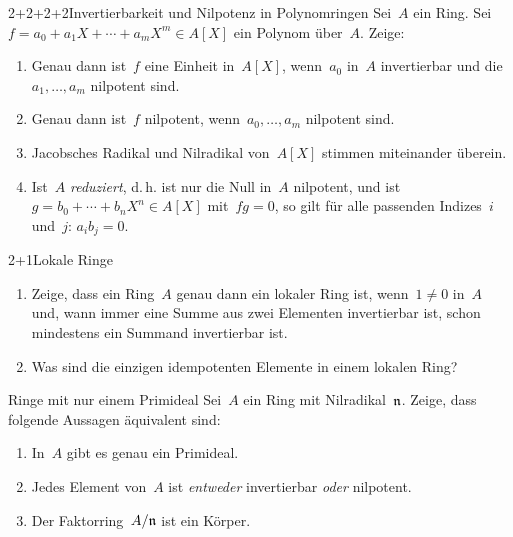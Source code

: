 \documentclass{uebblatt}
\begin{document}

\begin{aufgabe}{2+2+2+2}{Invertierbarkeit und Nilpotenz in Polynomringen}
Sei~$A$ ein Ring. Sei~$f = a_0 + a_1 X + \cdots + a_m X^m \in A[X]$ ein Polynom
über~$A$. Zeige:
\begin{enumerate}
\item Genau dann ist~$f$ eine Einheit in~$A[X]$, wenn~$a_0$ in~$A$ invertierbar
und die~$a_1,\ldots,a_m$ nilpotent sind.
\item Genau dann ist~$f$ nilpotent, wenn~$a_0,\ldots,a_m$ nilpotent sind.
\item Jacobsches Radikal und Nilradikal von~$A[X]$ stimmen miteinander überein.
\item Ist~$A$ \emph{reduziert}, d.\,h. ist nur die Null in~$A$ nilpotent,
und ist~$g = b_0 + \cdots + b_n X^n \in A[X]$ mit~$fg = 0$, so gilt für alle passenden Indizes~$i$ und~$j$: $a_i b_j = 0$.
\end{enumerate}
\end{aufgabe}

\begin{aufgabe}{2+1}{Lokale Ringe}
\begin{enumerate}
\item Zeige, dass ein Ring~$A$ genau dann ein lokaler Ring ist,
wenn~$1 \neq 0$ in~$A$ und, wann immer eine Summe aus zwei Elementen
invertierbar ist, schon mindestens ein Summand invertierbar ist.
\item Was sind die einzigen idempotenten Elemente in einem lokalen Ring?
\end{enumerate}
\end{aufgabe}

\begin{aufgabe}{4}{Ringe mit nur einem Primideal}
Sei~$A$ ein Ring mit Nilradikal~$\mathfrak{n}$. Zeige, dass folgende
Aussagen äquivalent sind:
\begin{enumerate}
\item[1.] In~$A$ gibt es genau ein Primideal.
\item[2.] Jedes Element von~$A$ ist \emph{entweder} invertierbar \emph{oder}
nilpotent.
\item[3.] Der Faktorring~$A/\mathfrak{n}$ ist ein Körper.
\end{enumerate}
\end{aufgabe}
\end{document}
